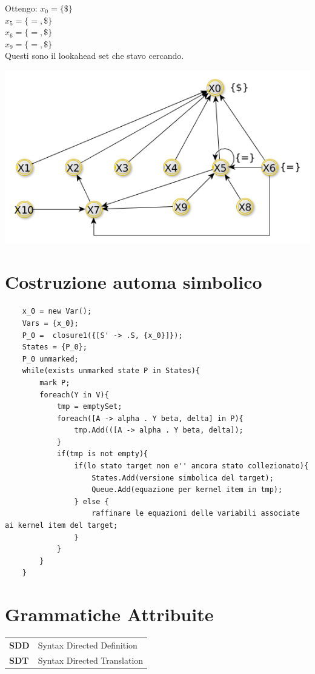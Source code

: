Ottengo:
$x_0 = \{ \$ \}$ \\
$x_5 = \{ =, \$ \}$ \\
$x_6 = \{ =, \$ \}$ \\
$x_9 = \{ =, \$ \}$ \\

Questi sono il lookahead set che stavo cercando.

\begin{center}
    \includegraphics[scale=0.6]{Chapters/Img/c05_07.png}\\
\end{center}

\section{Costruzione automa simbolico}
\begin{lstlisting}
	x_0 = new Var();
	Vars = {x_0};
	P_0 =  closure1({[S' -> .S, {x_0}]});
	States = {P_0};
	P_0 unmarked;
	while(exists unmarked state P in States){
		mark P;
		foreach(Y in V){
			tmp = emptySet;
			foreach([A -> alpha . Y beta, delta] in P){
				tmp.Add(([A -> alpha . Y beta, delta]);
			}
			if(tmp is not empty){
				if(lo stato target non e'' ancora stato collezionato){
					States.Add(versione simbolica del target);
					Queue.Add(equazione per kernel item in tmp);
				} else {
					raffinare le equazioni delle variabili associate ai kernel item del target;
				}
			}
		}
	}
\end{lstlisting}

\section{Grammatiche Attribuite}

\begin{center}
	\begin{tabular}{ll}
		\textbf{SDD} & Syntax Directed Definition\\
		\textbf{SDT} & Syntax Directed Translation \\
	\end{tabular}
\end{center}

